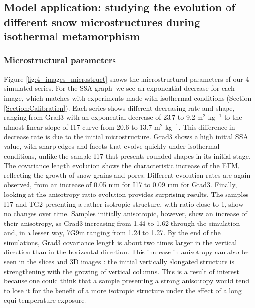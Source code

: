 \documentclass[draft,ms]{agujournal2019}
\begin{document}




\subsection{Model application: studying  the evolution of different snow microstructures during isothermal metamorphism}


\subsubsection{Microstructural parameters}

Figure \ref{fig:4_images_microstruct} shows the microstructural parameters of our 4 simulated series. For the SSA graph, we see an exponential decrease for each image, which matches with experiments made with isothermal conditions (Section \ref{Section:Calibration}). Each series shows different decreasing rate and shape, ranging from Grad3 with an exponential decrease of 23.7 to 9.2 m$^2$ kg$^{-1}$ to the almost linear slope of I17 curve from 20.6 to 13.7 m$^2$ kg$^{-1}$. This difference in decrease rate  is due to the initial microstructure. Grad3 shows a high initial SSA value, with sharp edges and facets that evolve quickly under isothermal conditions, unlike the sample I17 that presents rounded shapes in its initial stage.
The covariance length evolution shows the characteristic increase of the ETM, reflecting the growth of snow grains and pores. Different evolution rates are again observed, from an increase of 0.05 mm for I17 to 0.09 mm for Grad3. Finally, looking at the anisotropy ratio evolution provides surprising results. The samples I17 and TG2 presenting a rather isotropic structure, with ratio close to 1, show no changes over time. Samples initially anisotropic, however, show an increase of their anisotropy, as Grad3 increasing from 1.44 to 1.62 through the simulation and, in a lesser way, 7G9m ranging from 1.24 to 1.27. By the end of the simulations, Grad3 covariance length is about two times larger in the vertical direction than in the horizontal direction. This increase in anisotropy can also be seen in the slices and 3D images : the initial vertically elongated structure is strengthening with the growing of vertical columns. This is a result of interest because one could think that a sample presenting a strong anisotropy would tend to lose it for the benefit of a more isotropic structure under the effect of a long equi-temperature exposure.
\end{document}
